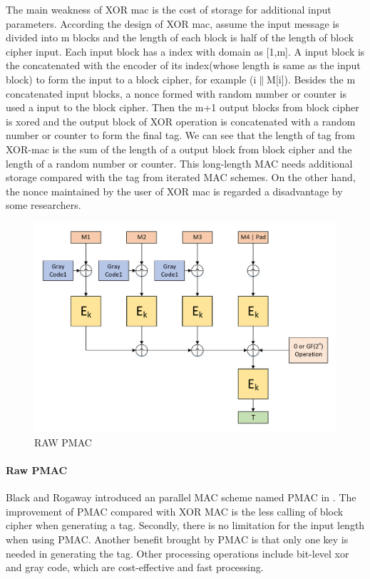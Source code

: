 \documentclass{article}
\begin{document}
The main weakness of XOR mac is the cost of storage for additional input parameters. According the design of XOR mac, assume the input message is divided into m blocks and the length of each block is half of the length of block cipher input. Each input block has a index with domain as [1,m]. A input block is the concatenated with the encoder of its index(whose length is same as the input block) to form the input to a block cipher, for example (i$\|$M[i]). Besides the m concatenated input blocks, a nonce formed with random number or counter is used a input to the block cipher. Then the m+1 output blocks from block cipher is xored and the output block of XOR operation is concatenated with a random number or counter to form the final tag. 
We can see that the length of tag from XOR-mac is the sum of the length of a output block from block cipher and the length of a random number or counter. This long-length MAC needs additional storage compared with the tag from iterated MAC schemes. 
On the other hand, the nonce maintained by the user of XOR mac is regarded a disadvantage by some researchers.
\begin{figure}[htbp]
\centering
\includegraphics[scale=0.5]{./diagrams/PMAC.pdf}
\caption{RAW PMAC}
\label{PMAC}
\end{figure}
\paragraph{Raw PMAC}
Black and Rogaway introduced an parallel MAC scheme named PMAC in \cite{pmac}. 
The improvement of PMAC compared with XOR MAC is the less calling of block cipher when generating a tag. Secondly, there is no limitation for the input length when using PMAC. 
Another benefit brought by PMAC is that only one key is needed in generating the tag. Other processing operations include bit-level xor and gray code, which are cost-effective and fast processing. 
\end{document}
